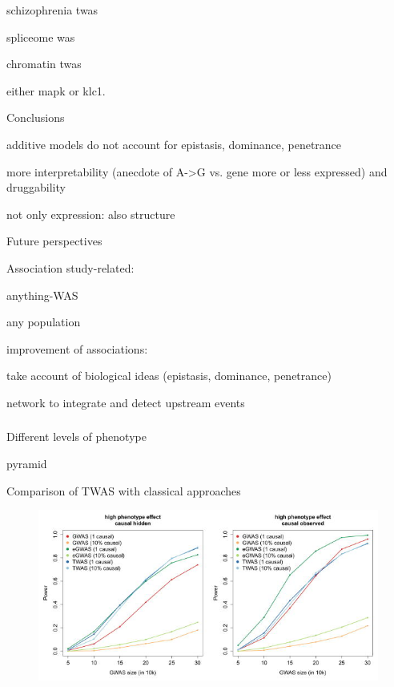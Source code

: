 \documentclass[aspectratio=169,12pt]{beamer}
\begin{document}
\begin{frame}

	schizophrenia twas

	spliceome was

	chromatin twas

\end{frame}

\begin{frame}

	either mapk or klc1.

\end{frame}

\begin{frame}{Conclusions}

	additive models do not account for epistasis, dominance, penetrance

	more interpretability (anecdote of A->G vs. gene more or less 
expressed) and druggability

	not only expression: also structure

\end{frame}

\begin{frame}{Future perspectives}

	Association study-related:

	anything-WAS

	any population

	improvement of associations:

	take account of biological ideas (epistasis, dominance, penetrance)

	network to integrate and detect upstream events

\end{frame}

\appendix

\begin{frame}[allowframebreaks] %
	\frametitle{}
	\nocite{*}
	\tiny
	\printbibliography[title=References,keyword=TWAS]
\end{frame}

\begin{frame}{Different levels of phenotype}

	pyramid

\end{frame}

\begin{frame}{Comparison of TWAS with classical approaches}

	\begin{figure}
		\includegraphics{gusev2016/5-association_power}
	\end{figure}


\end{frame}
\end{document}

